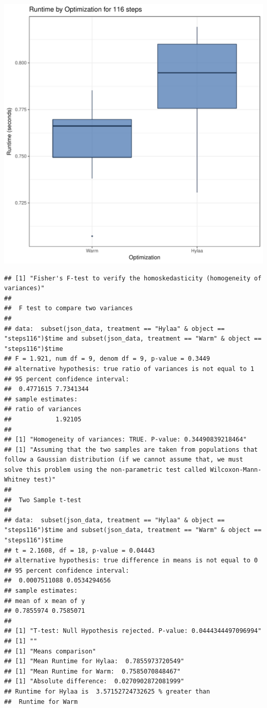 \documentclass{article}\usepackage[]{graphicx}\usepackage[]{color}
\makeatletter
\def\maxwidth{ %
  \ifdim\Gin@nat@width>\linewidth
    \linewidth
  \else
    \Gin@nat@width
  \fi
}
\newenvironment{kframe}{%
 \def\at@end@of@kframe{}%
 \ifinner\ifhmode%
  \def\at@end@of@kframe{\end{minipage}}%
  \begin{minipage}{\columnwidth}%
 \fi\fi%
 \def\FrameCommand##1{\hskip\@totalleftmargin \hskip-\fboxsep
 \colorbox{shadecolor}{##1}\hskip-\fboxsep
     \hskip-\linewidth \hskip-\@totalleftmargin \hskip\columnwidth}%
 \MakeFramed {\advance\hsize-\width
   \@totalleftmargin\z@ \linewidth\hsize
   \@setminipage}}%
 {\par\unskip\endMakeFramed%
 \at@end@of@kframe}
\newenvironment{knitrout}{}{} %
\makeatother
\begin{document}
\begin{knitrout}
\color{fgcolor}
\includegraphics[width=\maxwidth]{figure/RH1_steps116-1} 
\begin{kframe}\begin{verbatim}
## [1] "Fisher's F-test to verify the homoskedasticity (homogeneity of variances)"
## 
## 	F test to compare two variances
## 
## data:  subset(json_data, treatment == "Hylaa" & object == "steps116")$time and subset(json_data, treatment == "Warm" & object == "steps116")$time
## F = 1.921, num df = 9, denom df = 9, p-value = 0.3449
## alternative hypothesis: true ratio of variances is not equal to 1
## 95 percent confidence interval:
##  0.4771615 7.7341344
## sample estimates:
## ratio of variances 
##            1.92105 
## 
## [1] "Homogeneity of variances: TRUE. P-value: 0.34490839218464"
## [1] "Assuming that the two samples are taken from populations that follow a Gaussian distribution (if we cannot assume that, we must solve this problem using the non-parametric test called Wilcoxon-Mann-Whitney test)"
## 
## 	Two Sample t-test
## 
## data:  subset(json_data, treatment == "Hylaa" & object == "steps116")$time and subset(json_data, treatment == "Warm" & object == "steps116")$time
## t = 2.1608, df = 18, p-value = 0.04443
## alternative hypothesis: true difference in means is not equal to 0
## 95 percent confidence interval:
##  0.0007511088 0.0534294656
## sample estimates:
## mean of x mean of y 
## 0.7855974 0.7585071 
## 
## [1] "T-test: Null Hypothesis rejected. P-value: 0.0444344497096994"
## [1] ""
## [1] "Means comparison"
## [1] "Mean Runtime for Hylaa:  0.7855973720549"
## [1] "Mean Runtime for Warm:  0.7585070848467"
## [1] "Absolute difference:  0.0270902872081999"
## Runtime for Hylaa is  3.57152724732625 % greater than 
##  Runtime for Warm
\end{verbatim}
\end{kframe}
\end{knitrout}
\end{document}
